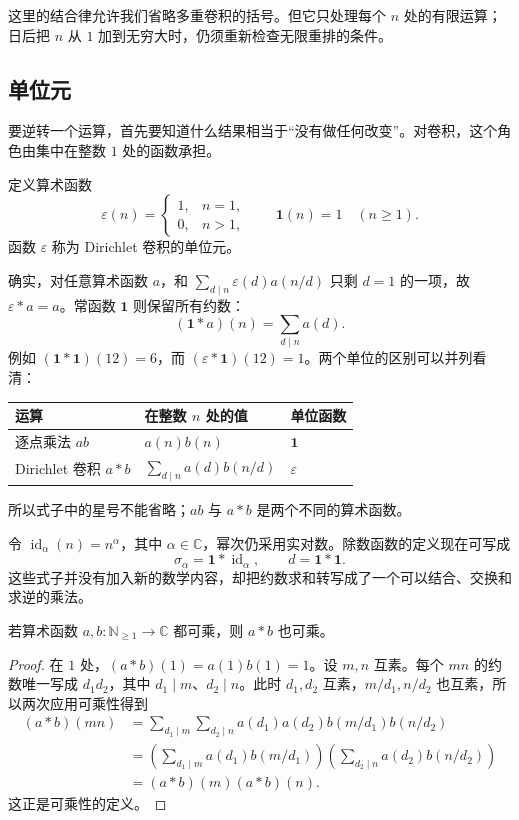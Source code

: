 这里的结合律允许我们省略多重卷积的括号。但它只处理每个 \(n\) 处的有限运算；日后把 \(n\) 从 \(1\) 加到无穷大时，仍须重新检查无限重排的条件。

\subsection{单位元}
\label{b3:subsec:250202}

要逆转一个运算，首先要知道什么结果相当于“没有做任何改变”。对卷积，这个角色由集中在整数 \(1\) 处的函数承担。

\begin{definition}\label{b3:def:25-convolution-unit}
定义算术函数
\[
 \varepsilon(n)=\begin{cases}1,&n=1,\\0,&n>1,\end{cases}
 \qquad \mathbf1(n)=1\quad(n\ge1).
\]
函数 \(\varepsilon\) 称为 Dirichlet 卷积的单位元。
\end{definition}

确实，对任意算术函数 \(a\)，和 \(\sum_{d\mid n}\varepsilon(d)a(n/d)\) 只剩 \(d=1\) 的一项，故 \(\varepsilon*a=a\)。常函数 \(\mathbf1\) 则保留所有约数：
\[
 (\mathbf1*a)(n)=\sum_{d\mid n}a(d).
\]
例如 \((\mathbf1*\mathbf1)(12)=6\)，而 \((\varepsilon*\mathbf1)(12)=1\)。两个单位的区别可以并列看清：
\begin{center}
\begin{tabular}{lll}
\toprule
运算 & 在整数 \(n\) 处的值 & 单位函数 \\
\midrule
逐点乘法 \(ab\) & \(a(n)b(n)\) & \(\mathbf1\) \\
Dirichlet 卷积 \(a*b\) & \(\sum_{d\mid n}a(d)b(n/d)\) & \(\varepsilon\) \\
\bottomrule
\end{tabular}
\end{center}
所以式子中的星号不能省略；\(ab\) 与 \(a*b\) 是两个不同的算术函数。

令 \(\operatorname{id}_\alpha(n)=n^\alpha\)，其中 \(\alpha\in\mathbb C\)，幂次仍采用实对数。除数函数的定义现在可写成
\[
 \sigma_\alpha=\mathbf1*\operatorname{id}_\alpha,
 \qquad d=\mathbf1*\mathbf1.
\]
这些式子并没有加入新的数学内容，却把约数求和转写成了一个可以结合、交换和求逆的乘法。

\begin{proposition}[可乘性在卷积下保持]
\label{b3:prop:25-convolution-multiplicative}
若算术函数 \(a,b:\mathbb N_{\ge1}\to\mathbb C\) 都可乘，则 \(a*b\) 也可乘。
\end{proposition}
\begin{proof}
在 \(1\) 处，\((a*b)(1)=a(1)b(1)=1\)。设 \(m,n\) 互素。每个 \(mn\) 的约数唯一写成 \(d_1d_2\)，其中 \(d_1\mid m\)、\(d_2\mid n\)。此时 \(d_1,d_2\) 互素，\(m/d_1,n/d_2\) 也互素，所以两次应用可乘性得到
\[
 \begin{aligned}
 (a*b)(mn)
 &=\sum_{d_1\mid m}\sum_{d_2\mid n}
      a(d_1)a(d_2)b(m/d_1)b(n/d_2)\\
 &=\left(\sum_{d_1\mid m}a(d_1)b(m/d_1)\right)
   \left(\sum_{d_2\mid n}a(d_2)b(n/d_2)\right)\\
 &=(a*b)(m)(a*b)(n).
 \end{aligned}
\]
这正是可乘性的定义。
\end{proof}

